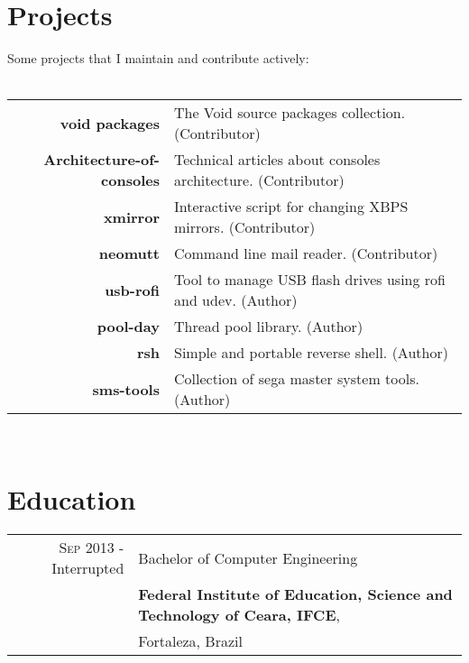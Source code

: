 \documentclass[a4paper,10pt]{article}
\begin{document}
\section{Projects}
\footnotesize{Some projects that I maintain and contribute actively:}\\ \\
\begin{tabular}{rl}
  \textbf{void packages}& The Void source packages collection. (Contributor)\\
  \textbf{Architecture-of-consoles}& Technical articles about consoles architecture. (Contributor)\\
  \textbf{xmirror}& Interactive script for changing XBPS mirrors. (Contributor)\\
  \textbf{neomutt}& Command line mail reader. (Contributor)\\
  \textbf{usb-rofi}& Tool to manage USB flash drives using rofi and udev. (Author)\\
  \textbf{pool-day}& Thread pool library. (Author)\\
  \textbf{rsh}& Simple and portable reverse shell. (Author)\\
  \textbf{sms-tools}& Collection of sega master system tools. (Author)\\
\end{tabular} \\

\section{Education}
\begin{tabular}{rl}
  \textsc{Sep} 2013 - Interrupted & Bachelor of Computer Engineering \\ & \textbf{Federal Institute of Education, Science and Technology of Ceara, IFCE}, \\ & Fortaleza,  Brazil
\end{tabular} \\

\end{document}
